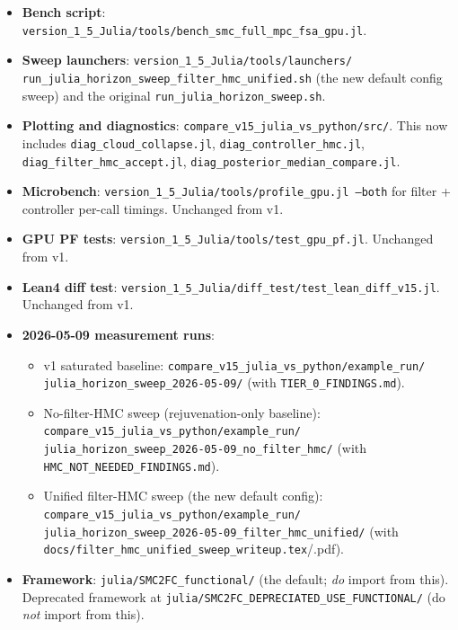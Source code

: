 \documentclass[11pt,a4paper]{article}
\begin{document}
\begin{itemize}[leftmargin=*, itemsep=2pt]
\item \textbf{Bench script}:
\texttt{version\_1\_5\_Julia/tools/bench\_smc\_full\_mpc\_fsa\_gpu.jl}.
\item \textbf{Sweep launchers}:
\texttt{version\_1\_5\_Julia/tools/launchers/}\\
\texttt{run\_julia\_horizon\_sweep\_filter\_hmc\_unified.sh} (the
new default config sweep) and the original
\texttt{run\_julia\_horizon\_sweep.sh}.
\item \textbf{Plotting and diagnostics}:
\texttt{compare\_v15\_julia\_vs\_python/src/}.
This now includes
\texttt{diag\_cloud\_collapse.jl},
\texttt{diag\_controller\_hmc.jl},
\texttt{diag\_filter\_hmc\_accept.jl},
\texttt{diag\_posterior\_median\_compare.jl}.
\item \textbf{Microbench}:
\texttt{version\_1\_5\_Julia/tools/profile\_gpu.jl --both} for
filter + controller per-call timings. Unchanged from v1.
\item \textbf{GPU PF tests}:
\texttt{version\_1\_5\_Julia/tools/test\_gpu\_pf.jl}. Unchanged
from v1.
\item \textbf{Lean4 diff test}:
\texttt{version\_1\_5\_Julia/diff\_test/test\_lean\_diff\_v15.jl}.
Unchanged from v1.
\item \textbf{2026-05-09 measurement runs}:
\begin{itemize}[itemsep=1pt]
  \item v1 saturated baseline:
    \texttt{compare\_v15\_julia\_vs\_python/example\_run/}\\
    \texttt{julia\_horizon\_sweep\_2026-05-09/} (with
    \texttt{TIER\_0\_FINDINGS.md}).
  \item No-filter-HMC sweep (rejuvenation-only baseline):
    \texttt{compare\_v15\_julia\_vs\_python/example\_run/}\\
    \texttt{julia\_horizon\_sweep\_2026-05-09\_no\_filter\_hmc/} (with
    \texttt{HMC\_NOT\_NEEDED\_FINDINGS.md}).
  \item Unified filter-HMC sweep (the new default config):
    \texttt{compare\_v15\_julia\_vs\_python/example\_run/}\\
    \texttt{julia\_horizon\_sweep\_2026-05-09\_filter\_hmc\_unified/} (with
    \texttt{docs/filter\_hmc\_unified\_sweep\_writeup.tex}/.pdf).
\end{itemize}
\item \textbf{Framework}:
\texttt{julia/SMC2FC\_functional/} (the default; \emph{do} import
from this). Deprecated framework at
\texttt{julia/SMC2FC\_DEPRECIATED\_USE\_FUNCTIONAL/} (do
\emph{not} import from this).
\end{itemize}
\end{document}
